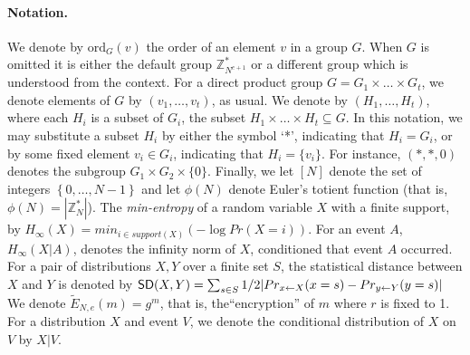 \documentclass[11pt]{article}
\newcommand{\SD}{{\sf SD }}
\newcommand{\order}{{\mathrm{ord}}}
\newcommand{\encdjnr}{{\tilde{E}}_{N,e}}
\newcommand{\set}[1]{\left\{#1\right\}}
\newcommand{\opbrange}[3][,]{#2#1\ldots#1#3}
\newcommand{\U}[1]{\mathbb{Z}_{#1}^*}
\begin{document}
\paragraph{Notation.} We denote by $\order_G(v)$ the order of an
element $v$ in a group $G$. When $G$ is omitted it is either the
default group $\U{N^{e+1}}$ or a different group which is
understood from the context. For a direct product group
$G=\opbrange[\times]{G_1}{G_t}$, we denote elements of $G$ by
$(\opbrange{v_1}{v_t})$, as usual.
We denote by $(\opbrange{H_1}{H_t})$, where each
$H_i$ is a subset of $G_i$, the subset
$\opbrange[\times]{H_1}{H_t}\subseteq G$. In this notation, we may
substitute a subset $H_i$ by either the symbol `*', indicating that
$H_i=G_i$, or by some fixed element $v_i\in G_i$, indicating that
$H_i=\{v_i\}$. For instance, $(*,*,0)$ denotes the subgroup
$G_1\times G_2\times \{0\}$. Finally, we let $[N]$ denote the set
of integers $\set{\opbrange{0}{N-1}}$ and let $\phi(N)$ denote
Euler's totient function (that is, $\phi(N)=|\U{N}|$). The \emph{min-entropy}
of a random variable $X$ with a finite support, by $H_\infty(X)=min_{i\in support(X)}(-\log{Pr(X=i)})$.
For an event $A$, $H_\infty(X|A)$, denotes the infinity norm of $X$, conditioned that event $A$ occurred. For a pair of distributions $X,Y$ over a finite set $S$, the statistical distance between $X$ and $Y$ is denoted by $\SD(X,Y) = \sum_{s\in S}1/2|Pr_{x\leftarrow X}(x = s) - Pr_{y\leftarrow Y}(y = s)|$
We denote $\encdjnr(m)=g^m$, that is, the``encryption'' of $m$ where $r$ is fixed to 1. For a distribution $X$ and event $V$, we denote the conditional distribution of $X$ on $V$ by $X|V$.
\end{document}
